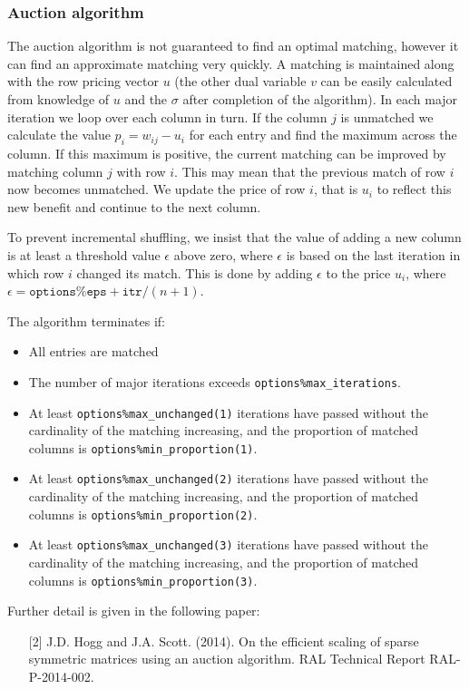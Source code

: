 \subsubsection{Auction algorithm} \label{method:auction}
The auction algorithm is not guaranteed to find an optimal matching, however it
can find an approximate matching very quickly. A matching is maintained along
with the row pricing vector $u$ (the other dual variable $v$ can be easily
calculated from knowledge of $u$ and the $\sigma$ after completion of the
algorithm). In each major iteration we loop over each column in turn. If the
column $j$ is unmatched we calculate the value $p_i = w_{ij} - u_i$ for each
entry and find the maximum across the column. If this maximum is positive, the
current matching can be improved by matching column $j$ with row $i$. This may
mean that the previous match of row $i$ now becomes unmatched. We update the
price of row $i$, that is $u_i$ to reflect this new benefit and continue to the
next column.

To prevent incremental shuffling, we insist that the value of
adding a new column is at least a threshold value $\epsilon$ above zero, where
$\epsilon$ is based on the last iteration in which row $i$ changed its match.
This is done by adding $\epsilon$ to the price $u_i$, where $\epsilon = \texttt{options\%eps} + \texttt{itr} / (n+1)$.

The algorithm terminates if:
\begin{itemize}
   \item All entries are matched
   \item The number of major iterations exceeds \texttt{options\%max\_iterations}.
   \item At least \texttt{options\%max\_unchanged(1)} iterations have passed without the cardinality of the matching increasing, and the proportion of matched columns is \texttt{options\%min\_proportion(1)}.
   \item At least \texttt{options\%max\_unchanged(2)} iterations have passed without the cardinality of the matching increasing, and the proportion of matched columns is \texttt{options\%min\_proportion(2)}.
   \item At least \texttt{options\%max\_unchanged(3)} iterations have passed without the cardinality of the matching increasing, and the proportion of matched columns is \texttt{options\%min\_proportion(3)}.
\end{itemize}

\noindent
Further detail is given in the following paper:
\begin{itemize}
   \item[{[2]}] J.D. Hogg and J.A. Scott. (2014). On the efficient scaling of sparse symmetric matrices using an auction algorithm. RAL Technical Report RAL-P-2014-002.
\end{itemize}

